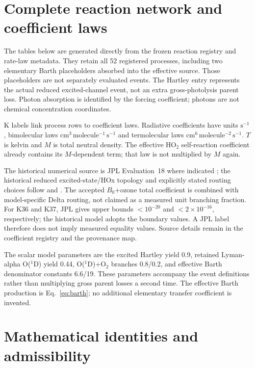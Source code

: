 \chapter{Complete reaction network and coefficient laws}\label{app:network}
The tables below are generated directly from the frozen reaction registry and rate-law metadata. They retain all 52 registered processes, including two elementary Barth placeholders absorbed into the effective source. Those placeholders are not separately evaluated events. The Hartley entry represents the actual reduced excited-channel event, not an extra gross-photolysis parent loss. Photon absorption is identified by the forcing coefficient; photons are not chemical concentration coordinates.

K labels link process rows to coefficient laws. Radiative coefficients have units $\mathrm{s^{-1}}$, bimolecular laws $\mathrm{cm^3\,molecule^{-1}\,s^{-1}}$ and termolecular laws $\mathrm{cm^6\,molecule^{-2}\,s^{-1}}$. $T$ is kelvin and $M$ is total neutral density. The effective HO$_2$ self-reaction coefficient already contains its $M$-dependent term; that law is not multiplied by $M$ again.

The historical numerical source is JPL Evaluation~18 where indicated \citep{jpl18}; the historical reduced excited-state/HOx topology and explicitly stated routing choices follow \citet{li2020} and \citet{brasseur2005}. The accepted $B_0$+ozone total coefficient is combined with model-specific Delta routing, not claimed as a measured unit branching fraction. For K36 and K37, JPL gives upper bounds $<10^{-20}$ and $<2\times10^{-16}$, respectively; the historical model adopts the boundary values. A JPL label therefore does not imply measured equality values. Source details remain in the coefficient registry and the provenance map.

\begingroup\footnotesize{}


\endgroup

The scalar model parameters are the excited Hartley yield 0.9, retained Lyman-alpha O($^1$D) yield 0.44, O($^1$D)+O$_2$ branches 0.8/0.2, and effective Barth denominator constants 6.6/19. These parameters accompany the event definitions rather than multiplying gross parent losses a second time. The effective Barth production is Eq.~\eqref{eq:barth}; no additional elementary transfer coefficient is invented.

\chapter{Mathematical identities and admissibility}\label{app:math}
